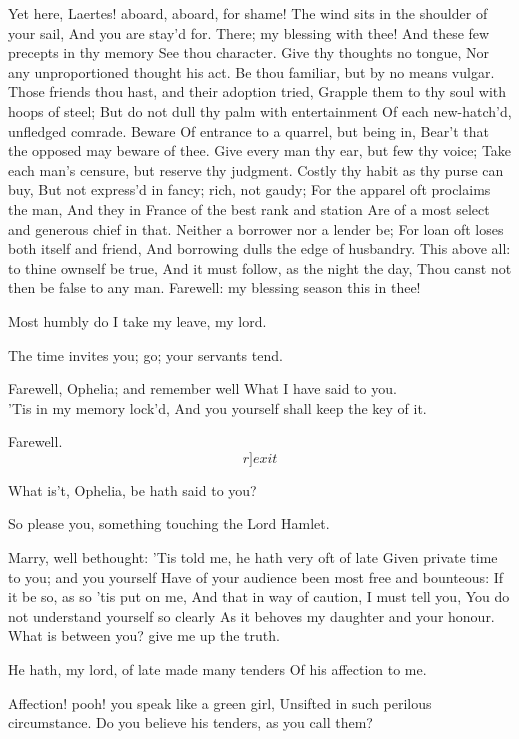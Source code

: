 \documentclass[11pt]{book}
\begin{document}
\5	Yet here, Laertes! aboard, aboard, for shame!
	The wind sits in the shoulder of your sail,
	And you are stay'd for. There; my blessing with thee!
	And these few precepts in thy memory
	See thou character. Give thy thoughts no tongue,
	Nor any unproportioned thought his act.
	Be thou familiar, but by no means vulgar.
	Those friends thou hast, and their adoption tried,
	Grapple them to thy soul with hoops of steel;
	But do not dull thy palm with entertainment
	Of each new-hatch'd, unfledged comrade. Beware
	Of entrance to a quarrel, but being in,
	Bear't that the opposed may beware of thee.
	Give every man thy ear, but few thy voice;
	Take each man's censure, but reserve thy judgment.
	Costly thy habit as thy purse can buy,
	But not express'd in fancy; rich, not gaudy;
	For the apparel oft proclaims the man,
	And they in France of the best rank and station
	Are of a most select and generous chief in that.
	Neither a borrower nor a lender be;
	For loan oft loses both itself and friend,
	And borrowing dulls the edge of husbandry.
	This above all: to thine ownself be true,
	And it must follow, as the night the day,
	Thou canst not then be false to any man.
	Farewell: my blessing season this in thee!

\7	Most humbly do I take my leave, my lord.

\5	The time invites you; go; your servants tend.

\7	Farewell, Ophelia; and remember well
	What I have said to you. \\

\4	'Tis in my memory lock'd,
	And you yourself shall keep the key of it.

\7	Farewell. \[r]exit\]

\5	What is't, Ophelia, be hath said to you?

\4	So please you, something touching the Lord Hamlet.

\5	Marry, well bethought:
	'Tis told me, he hath very oft of late
	Given private time to you; and you yourself
	Have of your audience been most free and bounteous:
	If it be so, as so 'tis put on me,
	And that in way of caution, I must tell you,
	You do not understand yourself so clearly
	As it behoves my daughter and your honour.
	What is between you? give me up the truth.

\4	He hath, my lord, of late made many tenders
	Of his affection to me.

\5	Affection! pooh! you speak like a green girl,
	Unsifted in such perilous circumstance.
	Do you believe his tenders, as you call them?
\end{document}
